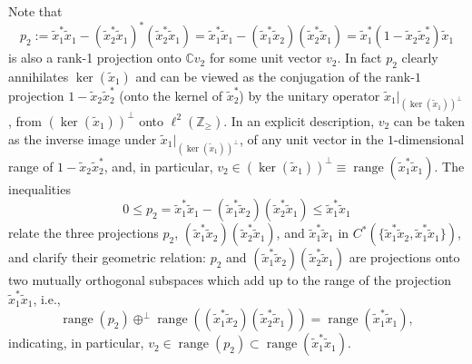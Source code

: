 \documentclass[pdftex]{sigma}
\begin{document}
Note that
\[
p_{2}:=\tilde{x}_{1}^{\ast}\tilde{x}_{1}- ( \tilde{x}_{2}^{\ast}\tilde
{x}_{1} ) ^{\ast} ( \tilde{x}_{2}^{\ast}\tilde{x}_{1} )
=\tilde{x}_{1}^{\ast}\tilde{x}_{1}- ( \tilde{x}_{1}^{\ast}\tilde{x}%
_{2} ) ( \tilde{x}_{2}^{\ast}\tilde{x}_{1} ) =\tilde{x}%
_{1}^{\ast} ( 1-\tilde{x}_{2}\tilde{x}_{2}^{\ast} ) \tilde{x}_{1}%
\]
is also a rank-1 projection onto $\mathbb{C}v_{2}$ for some unit vector
$v_{2}$. In fact $p_{2}$ clearly annihilates $\ker ( \tilde{x}_{1} )
$ and can be viewed as the conjugation of the rank-$1$ projection $1-\tilde{x}_{2}\tilde{x}_{2}%
^{\ast}$ (onto the kernel of $\tilde{x}_{2}^{\ast}$) by the unitary
operator $\tilde{x}_{1}|_{( \ker( \tilde{x}_{1}))
^{\perp}}$, from $( \ker( \tilde{x}_{1})) ^{\perp}$
onto $\ell^{2}( \mathbb{Z}_{\geq}) $. In an explicit description, $v_{2}$
can be taken as the inverse image under $\tilde{x}_{1}|_{( \ker( \tilde{x}_{1})) ^{\perp}}$,
of any unit vector in the $1$-dimensional range of $1-\tilde{x}_{2}\tilde{x}%
_{2}^{\ast}$, and, in particular, $v_{2}\in( \ker( \tilde{x}
_{1})) ^{\perp}\equiv\operatorname{range}( \tilde{x}_{1}^{\ast}\tilde{x}_{1})$.
The inequalities
\[
0\leq p_{2}=\tilde{x}_{1}^{\ast}\tilde{x}_{1}-( \tilde{x}_{1}^{\ast
}\tilde{x}_{2}) ( \tilde{x}_{2}^{\ast}\tilde{x}_{1})
\leq\tilde{x}_{1}^{\ast}\tilde{x}_{1}
\]
relate the three projections $p_{2}$, $( \tilde{x}_{1}^{\ast}
\tilde{x}_{2}) ( \tilde{x}_{2}^{\ast}\tilde{x}_{1}) $, and
$\tilde{x}_{1}^{\ast}\tilde{x}_{1}$ in $C^{\ast}(\{ \tilde{x}
_{1}^{\ast}\tilde{x}_{2},\tilde{x}_{1}^{\ast}\tilde{x}_{1}\})
$, and clarify their geometric relation: $p_{2}$ and $( \tilde
{x}_{1}^{\ast}\tilde{x}_{2}) ( \tilde{x}_{2}^{\ast}\tilde{x}%
_{1}) $ are projections onto two mutually orthogonal subspaces which
add up to the range of the projection $\tilde{x}_{1}^{\ast}\tilde{x}_{1}$,
i.e.,
\[
\operatorname{range}( p_{2}) \oplus^{\perp}\operatorname{range}%
(( \tilde{x}_{1}^{\ast}\tilde{x}_{2}) ( \tilde
{x}_{2}^{\ast}\tilde{x}_{1})) =\operatorname{range}(
\tilde{x}_{1}^{\ast}\tilde{x}_{1}) ,
\]
indicating, in particular, $v_{2}\in\operatorname{range}( p_{2})
\subset\operatorname{range}( \tilde{x}_{1}^{\ast}\tilde{x}_{1})$.
\end{document}
